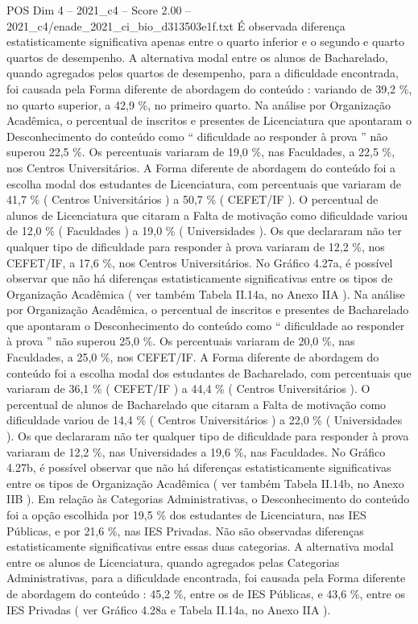 \begin{textsample}{POS Dim 4 – 2021\_c4 – Score 2.00 – 2021\_c4/enade\_2021\_ci\_bio\_d313503e1f.txt}
É observada diferença estatisticamente significativa apenas entre o quarto inferior e o segundo e quarto quartos de desempenho.
A alternativa modal entre os alunos de Bacharelado, quando agregados pelos quartos de desempenho, para a dificuldade encontrada, foi causada pela Forma diferente de abordagem do conteúdo : variando de 39,2 \%, no quarto superior, a 42,9 \%, no primeiro quarto.
Na análise por Organização Acadêmica, o percentual de inscritos e presentes de Licenciatura que apontaram o Desconhecimento do conteúdo como “ dificuldade ao responder à prova ” não superou 22,5 \%.
Os percentuais variaram de 19,0 \%, nas Faculdades, a 22,5 \%, nos Centros Universitários.
A Forma diferente de abordagem do conteúdo foi a escolha modal dos estudantes de Licenciatura, com percentuais que variaram de 41,7 \% ( Centros Universitários ) a 50,7 \% ( CEFET/IF ).
O percentual de alunos de Licenciatura que citaram a Falta de motivação como dificuldade variou de 12,0 \% ( Faculdades ) a 19,0 \% ( Universidades ).
Os que declararam não ter qualquer tipo de dificuldade para responder à prova variaram de 12,2 \%, nos CEFET/IF, a 17,6 \%, nos Centros Universitários.
No Gráfico 4.27a, é possível observar que não há diferenças estatisticamente significativas entre os tipos de Organização Acadêmica ( ver também Tabela II.14a, no Anexo IIA ).
Na análise por Organização Acadêmica, o percentual de inscritos e presentes de Bacharelado que apontaram o Desconhecimento do conteúdo como “ dificuldade ao responder à prova ” não superou 25,0 \%.
Os percentuais variaram de 20,0 \%, nas Faculdades, a 25,0 \%, nos CEFET/IF.
A Forma diferente de abordagem do conteúdo foi a escolha modal dos estudantes de Bacharelado, com percentuais que variaram de 36,1 \% ( CEFET/IF ) a 44,4 \% ( Centros Universitários ).
O percentual de alunos de Bacharelado que citaram a Falta de motivação como dificuldade variou de 14,4 \% ( Centros Universitários ) a 22,0 \% ( Universidades ).
Os que declararam não ter qualquer tipo de dificuldade para responder à prova variaram de 12,2 \%, nas Universidades a 19,6 \%, nas Faculdades.
No Gráfico 4.27b, é possível observar que não há diferenças estatisticamente significativas entre os tipos de Organização Acadêmica ( ver também Tabela II.14b, no Anexo IIB ).
Em relação às Categorias Administrativas, o Desconhecimento do conteúdo foi a opção escolhida por 19,5 \% dos estudantes de Licenciatura, nas IES Públicas, e por 21,6 \%, nas IES Privadas.
Não são observadas diferenças estatisticamente significativas entre essas duas categorias.
A alternativa modal entre os alunos de Licenciatura, quando agregados pelas Categorias Administrativas, para a dificuldade encontrada, foi causada pela Forma diferente de abordagem do conteúdo : 45,2 \%, entre os de IES Públicas, e 43,6 \%, entre os IES Privadas ( ver Gráfico 4.28a e Tabela II.14a, no Anexo IIA ).

\end{textsample}
